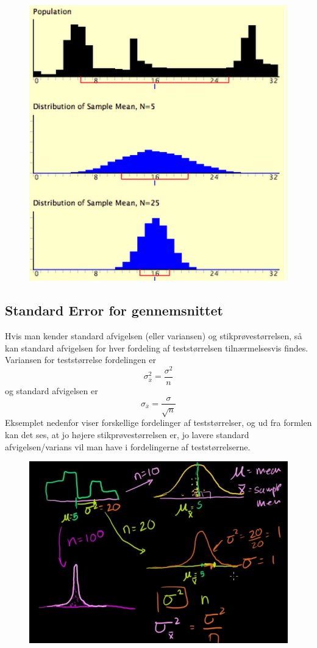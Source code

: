 \documentclass[11pt]{article}
\begin{document}
\begin{figure}[H]
\centering
\includegraphics[scale=0.5]{img/Selection_009}
\end{figure}
\subsection{Standard Error for gennemsnittet}
Hvis man kender standard afvigelsen (eller variansen) og stikprøvestørrelsen, så kan standard afvigelsen for hver fordeling af teststørrelsen tilnærmelsesvis findes. Variansen for teststørrelse fordelingen er
$$\sigma^2_{\bar{x}}=\frac{\sigma^2}{n}$$
og standard afvigelsen er
$$\sigma_{\bar{x}}=\frac{\sigma}{\sqrt{n}}$$
Eksemplet nedenfor viser forskellige fordelinger af teststørrelser, og ud fra formlen kan det ses, at jo højere stikprøvestørrelsen er, jo lavere standard afvigelsen/varians vil man have i fordelingerne af teststørrelserne. 
\begin{figure}[H]
\centering
\includegraphics[scale=0.5]{img/Selection_010}
\end{figure}
\end{document}
